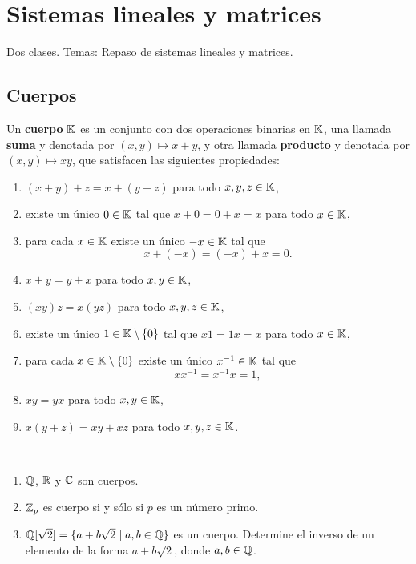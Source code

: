\chapter{Sistemas lineales y matrices}

Dos clases. Temas: Repaso de sistemas lineales y matrices. 

\section{Cuerpos}

\begin{block}
    Un \textbf{cuerpo} $\mathbb{K}$ es un conjunto con dos operaciones binarias en $\mathbb{K}$, 
    una llamada \textbf{suma} y denotada por $(x,y)\mapsto
    x+y$, y otra llamada \textbf{producto} y denotada por $(x,y)\mapsto xy$,
    que satisfacen las siguientes propiedades:
	\begin{enumerate}
		\item $(x+y)+z=x+(y+z)$ para todo $x,y,z\in\mathbb{K}$,
		\item existe un único $0\in\mathbb{K}$ tal que $x+0=0+x=x$ para todo $x\in\mathbb{K}$,
		\item para cada $x\in\mathbb{K}$ existe un único $-x\in\mathbb{K}$ tal que 
            \[
                x+(-x)=(-x)+x=0.
                \]
		\item $x+y=y+x$ para todo $x,y\in\mathbb{K}$,
		\item $(xy)z=x(yz)$ para todo $x,y,z\in\mathbb{K}$,
        \item existe un único $1\in\mathbb{K}\setminus\{0\}$ tal que $x1=1x=x$ para todo $x\in\mathbb{K}$,
        \item para cada $x\in\mathbb{K}\setminus\{0\}$ existe un único $x^{-1}\in\mathbb{K}$
            tal que \[
            xx^{-1}=x^{-1}x=1,
            \]
		\item $xy=yx$ para todo $x,y\in\mathbb{K}$,
		\item $x(y+z)=xy+xz$ para todo $x,y,z\in\mathbb{K}$.
	\end{enumerate}
\end{block}

\begin{examples}\
	\begin{enumerate}
		\item $\mathbb{Q}$, $\mathbb{R}$ y $\mathbb{C}$ son cuerpos.
		\item $\mathbb{Z}_p$ es cuerpo si y sólo si $p$ es un número primo.
        \item $\mathbb{Q}[\sqrt{2}]=\{a+b\sqrt{2}\mid a,b\in\mathbb{Q}\}$ es un cuerpo.
            Determine el inverso de un elemento de la forma $a+b\sqrt{2}$,
            donde $a,b\in\mathbb{Q}$.
	\end{enumerate}
\end{examples}

